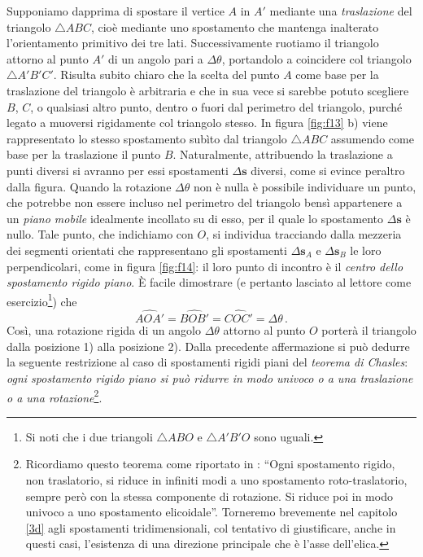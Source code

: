 \noindent Supponiamo dapprima di spostare
il vertice $A$ in $A'$ mediante una {\em traslazione}
del triangolo $\triangle{ABC}$, cio\`e mediante uno spostamento che mantenga inalterato
l'orientamento primitivo dei tre lati.  Successivamente ruotiamo il triangolo
attorno al punto $A'$ di un angolo pari a $\Delta \theta$, portandolo a coincidere
col triangolo $\triangle A'B'C'$.
Risulta subito chiaro che la scelta del punto $A$ come base per 
la traslazione del triangolo \`e arbitraria e che in sua vece si sarebbe potuto scegliere $B$, $C$, o qualsiasi
altro punto, dentro o fuori dal perimetro del triangolo, purch\'e legato a muoversi
rigidamente col triangolo stesso. In figura \ref{fig:f13} b) viene rappresentato lo stesso spostamento sub\`ito
dal triangolo $\triangle ABC$ assumendo come base per la traslazione il punto $B$.
Naturalmente, attribuendo 
la traslazione a punti diversi si avranno per essi spostamenti
$\Delta {\bm s}$ diversi, come si evince peraltro dalla figura.
Quando la rotazione $\Delta \theta$ non \`e nulla
\`e possibile
individuare un punto, che potrebbe
non essere incluso nel perimetro del triangolo bens\`i appartenere a un {\em piano mobile}
idealmente incollato su di esso, per il quale lo spostamento $\Delta {\bm{s}}$ \`e nullo.
Tale punto, che indichiamo con $O$, si individua
tracciando dalla mezzeria dei segmenti orientati che
rappresentano gli spostamenti 
{$\Delta {\bm s}_{\scriptscriptstyle{A}}$} e
{$\Delta {\bm s}_{\scriptscriptstyle{B}}$} le loro perpendicolari,
come in figura \ref{fig:f14}: il loro punto di incontro 
\`e il {\em centro dello spostamento rigido piano}.
\`E facile dimostrare (e pertanto lasciato al lettore come esercizio\footnote{
	Si noti che  i due triangoli $\triangle{ABO}$ e $\triangle{A'B'O}$
sono uguali.}) che 
\begin{equation}
	\widehat{AOA'} = \widehat{BOB'} = \widehat{COC'} =\Delta \theta \,.
	\label{e13}
\end{equation}	
\noindent Cos\`i, una rotazione rigida
di un angolo $\Delta \theta$ attorno al punto $O$
porter\`a il triangolo dalla posizione 1) alla posizione 2).
Dalla precedente affermazione si pu\`o dedurre la seguente restrizione
al caso di spostamenti rigidi piani del {\em teorema di 
Chasles}: {\em ogni spostamento rigido piano
si pu\`o ridurre in modo univoco
o a una traslazione o a una rotazione}\footnote{
Ricordiamo questo teorema
come riportato in \cite{finzi}:
``Ogni spostamento rigido, non traslatorio,
si riduce in infiniti modi a uno
spostamento roto-traslatorio, sempre per\`o con la stessa componente di
rotazione. Si riduce poi in modo
univoco a uno spostamento elicoidale''.
Torneremo brevemente nel capitolo \ref{3d}
agli spostamenti tridimensionali, col tentativo
di giustificare, anche in questi casi,
l'esistenza di una direzione principale che \`e l'asse
dell'elica.}.  \label{chasles}

